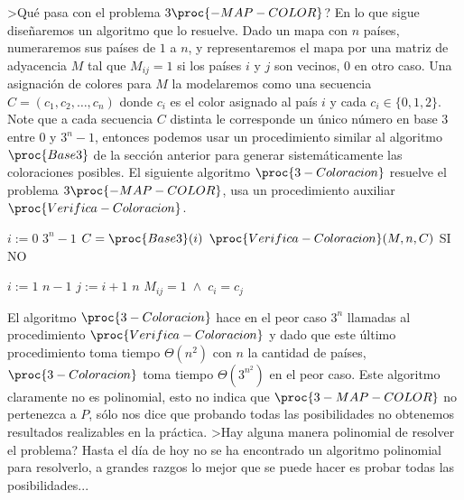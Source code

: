 \begin{ejemplo}
>Qué pasa con el problema $3\proc{-MAP-COLOR}$?
En lo que sigue diseñaremos un algoritmo que lo resuelve.
Dado un mapa con $n$ países, numeraremos sus países de $1$ a $n$, y representaremos el mapa por una matriz de adyacencia $M$ tal que $M_{ij}=1$ si los países $i$ y $j$ son vecinos, $0$ en otro caso.
Una asignación de colores para $M$ la modelaremos como una secuencia $C=(c_1,c_2,\ldots,c_n)$ donde $c_i$ es el color asignado al país $i$ y cada $c_i\in\{0,1,2\}$.
Note que a cada secuencia $C$ distinta le corresponde un único número en base $3$ entre $0$ y $3^n-1$, entonces podemos usar un procedimiento similar al algoritmo $\proc{Base3}$ de la sección anterior para generar sistemáticamente las coloraciones posibles.
El siguiente algoritmo $\proc{3-Coloracion}$ resuelve el problema $3\proc{-MAP-COLOR}$, usa un procedimiento auxiliar $\proc{Verifica-Coloracion}$.
\begin{codebox}
\li \For $i:=0$ \To $3^n-1$
\li \> $C=\proc{Base3}(i)$
\li \> \If $\proc{Verifica-Coloracion}(M,n,C)$ \Then
\li \> \> \Return SI
\li \Return NO
\end{codebox}
\begin{codebox}
\li \For $i:=1$ \To $n-1$
\li \> \For $j:=i+1$ \To $n$
\li \> \> \If $M_{ij}=1\;\wedge\;c_i=c_j$ \Then
\li \> \> \> 
\li {}
\end{codebox}
El algoritmo $\proc{3-Coloracion}$ hace en el peor caso $3^n$ llamadas al procedimiento $\proc{Verifica-Coloracion}$ y dado que este último procedimiento toma tiempo $\Theta(n^2)$ con $n$ la cantidad de países, $\proc{3-Coloracion}$ toma tiempo $\Theta(3^{n^2})$ en el peor caso.
Este algoritmo claramente no es polinomial, esto no indica que $\proc{3-MAP-COLOR}$ no pertenezca a $P$, sólo nos dice que probando todas las posibilidades no obtenemos resultados realizables en la práctica.
>Hay alguna manera polinomial de resolver el problema?
Hasta el día de hoy no se ha encontrado un algoritmo polinomial para resolverlo, a grandes razgos lo mejor que se puede hacer es probar todas las posibilidades...
\end{ejemplo}

